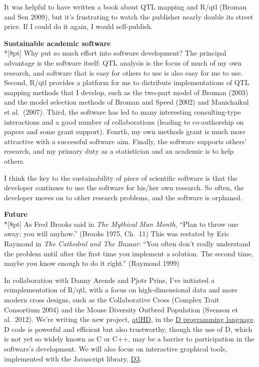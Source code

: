\documentclass[letterpaper]{article}
\begin{document}
\begin{multicols}{2}
It was helpful to have written a book about QTL mapping and R/qtl
(Broman and Sen 2009), but it's frustrating to watch the publisher
nearly double its street price. If I could do it again, I would
self-publish.


\bigskip
{}
\noindent \textbf{\sffamily Sustainable academic software}\\*[8pt]
Why put so much effort into software development? The principal
advantage is the software itself: QTL analysis is the focus of much of
my own research, and software that is easy for others to use is also
easy for me to use. Second, R/qtl provides a platform for me to
distribute implementations of QTL mapping methods that I develop, such
as the two-part model of Broman (2003) and the model
selection methods of Broman and Speed (2002) and Manichaikul et
al.\ (2007). Third, the software has led to many interesting
consulting-type interactions and a good number of collaborations (leading
to co-authorship on papers and some grant support). Fourth, my own
methods grant is much more attractive with a successful software aim.
Finally, the software supports others' research, and my primary
duty as a statistician and an academic is to help others.

I think the key to the sustainability of piece of scientific software
is that the developer continues to use the software
for his/her own research. So often, the developer moves on to other
research problems, and the software is orphaned.

\bigskip
{}
\noindent \textbf{\sffamily Future} \\*[8pt]
As Fred Brooks said in \emph{The Mythical Man Month},
``Plan to throw one away; you will anyhow.'' (Brooks 1975,
Ch.\ 11) This was
restated by Eric Raymond in \emph{The Cathedral and The Bazaar}:
``You
often don't really understand the problem until after the first time
you implement a solution. The second time, maybe you know enough to do
it right.'' (Raymond 1999)

In collaboration with Danny Arends and Pjotr Prins, I've initiated a
reimplementation of R/qtl, with a focus on high-dimensional data and
more modern cross designs, such as the Collaborative Cross (Complex
Trait Consortium 2004)
and the Mouse Diversity Outbred Population (Svenson et al.\ 2012).
We're writing the new project, \href{https://github.com/qtlHD/qtlHD}{qtlHD},
in the \href{http://dlang.org/}{D programming language}. D code is powerful
and efficient but also trustworthy, though the use of D, which is not
yet so widely known as C or C++, may be a
barrier to participation in the software's development. We will also
focus on interactive graphical tools, implemented with the
Javascript library, \href{http://d3js.org/}{D3}.


\end{multicols}
\end{document}
